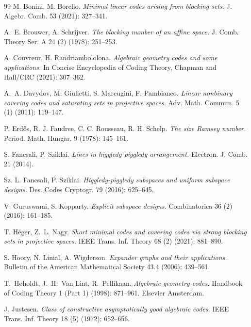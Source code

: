 \documentclass[11pt]{article}
\theoremstyle{plain}
\theoremstyle{definition}
\begin{document}
\begin{thebibliography}{99}
M. Bonini, M. Borello.
\emph{Minimal linear codes arising from blocking sets.}
J. Algebr. Comb. 53 (2021): 327--341.

A.~E. Brouwer, A. Schrijver.
\emph{The blocking number of an affine space.}
J. Comb. Theory Ser. A 24 (2) (1978): 251--253.


A. Couvreur, H. Randriambololona.
\emph{Algebraic geometry codes and some applications.}
In Concise Encyclopedia of Coding Theory, Chapman and Hall/CRC (2021): 307--362.


A.~A. Davydov, M. Giulietti, S. Marcugini, F. Pambianco.
\emph{Linear nonbinary covering codes and saturating sets in projective spaces.}
Adv. Math. Commun. 5 (1) (2011): 119--147.

P. Erd\H{o}s, R. J. Faudree, C. C. Rousseau, R. H. Schelp.
\emph{The size Ramsey number.}
Period. Math. Hungar. 9 (1978): 145--161.

S. Fancsali, P. Sziklai.
\emph{Lines in higgledy-piggledy arrangement.}
Electron. J. Comb. 21 (2014).

Sz. L. Fancsali, P. Sziklai.
\emph{Higgledy-piggledy subspaces and uniform subspace designs.}
Des. Codes Cryptogr. 79 (2016): 625--645.

V. Guruswami, S. Kopparty.
\emph{Explicit subspace designs.}
Combinatorica 36 (2) (2016): 161--185.

T. H{\'e}ger, Z.~L. Nagy.
\emph{Short minimal codes and covering codes via strong blocking sets in projective spaces.}
IEEE Trans. Inf. Theory 68 (2) (2021): 881--890.

S. Hoory, N. Linial, A. Wigderson.
\emph{Expander graphs and their applications.}
Bulletin of the American Mathematical Society 43.4 (2006): 439--561.

T.~H{\o}holdt, J.~H.~Van Lint, R.~Pellikaan.
\emph{Algebraic geometry codes.}
Handbook of Coding Theory 1 (Part 1) (1998): 871--961. Elsevier Amsterdam.

J. Justesen.
\emph{Class of constructive asymptotically good algebraic codes.}
IEEE Trans. Inf. Theory 18 (5) (1972): 652--656.



\end{thebibliography}
\end{document}
